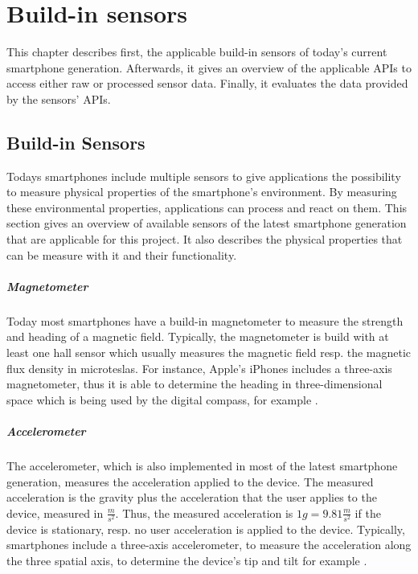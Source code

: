 \chapter{Build-in sensors} \label{chap:sensors} %

This chapter describes first, the applicable build-in sensors of today's current smartphone generation.
Afterwards, it gives an overview of the applicable \acsp{API} to access either raw or processed sensor data.
Finally, it evaluates the data provided by the sensors' \acsp{API}.


\section{Build-in Sensors}

Todays smartphones include multiple sensors to give applications the possibility to measure physical properties of the smartphone's environment.
By measuring these environmental properties, applications can process and react on them.
This section gives an overview of available sensors of the latest smartphone generation that are applicable for this project.
It also describes the physical properties that can be measure with it and their functionality.


\paragraph{Magnetometer}

Today most smartphones have a build-in magnetometer to measure the strength and heading of a magnetic field.
Typically, the magnetometer is build with at least one hall sensor which usually measures the magnetic field resp. the magnetic flux density in microteslas.
For instance, Apple's iPhones includes a three-axis magnetometer, thus it is able to determine the heading in three-dimensional space which is being used by the digital compass, for example \cite{ios_cm, wwdc_2012}.


\paragraph{Accelerometer}

The accelerometer, which is also implemented in most of the latest smartphone generation, measures the acceleration applied to the device.
The measured acceleration is the gravity plus the acceleration that the user applies to the device, measured in $\frac{m}{s^2}$.
Thus, the measured acceleration is $1g = 9.81 \frac{m}{s^2}$ if the device is stationary, resp. no user acceleration is applied to the device.
Typically, smartphones include a three-axis accelerometer, to measure the acceleration along the three spatial axis, to determine the device's tip and tilt for example \cite{ios_cm, wwdc_2012}.


